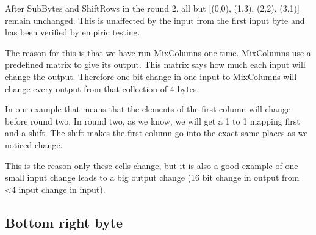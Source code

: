 After SubBytes and ShiftRows in the round 2, all but [(0,0), (1,3), (2,2), (3,1)] remain unchanged.
This is unaffected by the input from the first input byte and has been verified by empiric testing.

The reason for this is that we have run MixColumns one time.
MixColumns use a predefined matrix to give its output.
This matrix says how much each input will change the output.
Therefore one bit change in one input to MixColumns will change every output from that collection of 4 bytes.

In our example that means that the elements of the first column will change before round two.
In round two, as we know, we will get a 1 to 1 mapping first and a shift.
The shift makes the first column go into the exact same places as we noticed change.

This is the reason only these cells change, but it is also a good example of one small input change leads to a big output change (16 bit change in output from <4 input change in input).

\subsection*{Bottom right byte}



